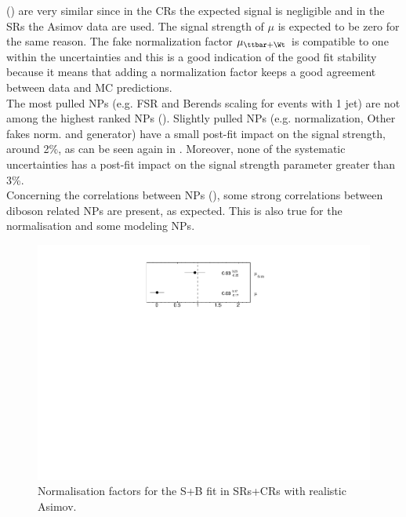 () 
are very similar since in the CRs the expected signal is negligible
and in the SRs the Asimov data are used. 
The signal strength of $\mu$ is expected to be zero for the same reason.
The fake normalization factor $\mu_{\ttbar+\Wt}$ is compatible to one within the uncertainties and
this is a good indication of the good fit stability because it means that adding a normalization factor keeps
a good agreement between data and MC predictions.\\
The most pulled NPs (e.g. \ttbar FSR and \VVHF Berends scaling for events with 1 jet) are
not among the highest ranked NPs (). 
Slightly pulled NPs (e.g. \ttZ normalization, Other fakes norm. and \VVHF generator) have a small post-fit impact on the signal strength, around 2\%, as can be seen again in . Moreover, none of the systematic uncertainties has a post-fit impact on the signal strength parameter greater than 3\%.\\
Concerning the correlations between NPs
(), some strong correlations
between diboson related NPs are present, as expected. This is also
true for the \ttbar normalisation and some \ttbar modeling NPs. 

\begin{figure}[htbp]
	\centering
	\includegraphics[width=.5\textwidth]{Chapters/CH8/figures/SPLUSB_CRSR_UsingDL1rcFullSys/NormFactors}
	\caption{Normalisation factors for the S+B \tZc fit in SRs+CRs with realistic Asimov.}%
	\label{fig:stat:tzc:splusb:crsr:norm}
\end{figure}

